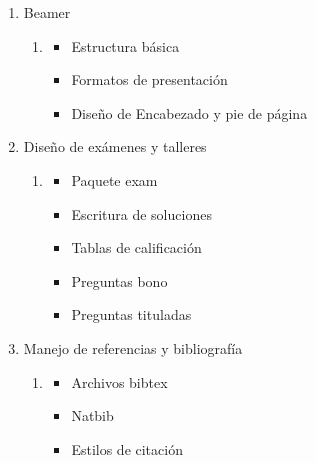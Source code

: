 \documentclass[12pt]{article}
\begin{document}
\begin{enumerate}[label={\bfseries\arabic*.}]
\begin{enumerate}[start=1,label={\large\bfseries Módulo\ \arabic*:},leftmargin=2cm]
\begin{enumerate}[start=6,label={\bfseries Semana\ \arabic*:},leftmargin=1cm,rightmargin=.1\linewidth]
\begin{itemize}
\begin{itemize}
                \item Redes
            \end{itemize}
            \item Colores
            \item Gráficos con datos desde \LaTeX\ .
        \end{itemize}
    \end{enumerate}
    \item Beamer
    \begin{enumerate}[start=7,label={\bfseries Semana\ \arabic*:},leftmargin=1cm,rightmargin=.1\linewidth]
        \item
        \begin{itemize}
            \item Estructura básica
            \item Formatos de presentación
            \item Diseño de Encabezado y pie de página
        \end{itemize}
    \end{enumerate}
    \item Diseño de exámenes y talleres 
    \begin{enumerate}[start=8,label={\bfseries Semana\ \arabic*:},leftmargin=1cm,rightmargin=.1\linewidth]
        \item
        \begin{itemize}
            \item Paquete exam
            \item Escritura de soluciones
            \item Tablas de calificación
            \item Preguntas bono
            \item Preguntas tituladas
        \end{itemize}
    \end{enumerate}
    \item Manejo de referencias y bibliografía
     \begin{enumerate}[start=9,label={\bfseries Semana\ \arabic*:},leftmargin=1cm,rightmargin=.1\linewidth]
        \item
        \begin{itemize}
            \item Archivos bibtex
            \item Natbib
            \item Estilos de citación
        \end{itemize}
    \end{enumerate}

\end{enumerate}
\end{enumerate}
\end{document}
